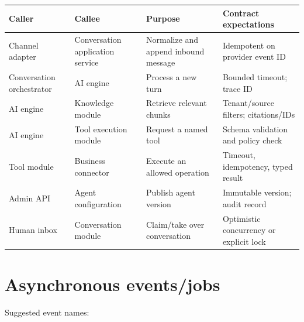 {\small
\begin{longtable}{@{}>{\raggedright\arraybackslash}p{}>{\raggedright\arraybackslash}p{}>{\raggedright\arraybackslash}p{}>{\raggedright\arraybackslash}p{}@{}}
\toprule
\textbf{Caller} & \textbf{Callee} & \textbf{Purpose} & \textbf{Contract expectations} \\
\midrule
\endhead
\bottomrule
\endfoot
Channel adapter & Conversation application service & Normalize and append inbound message & Idempotent on provider event ID \\
Conversation orchestrator & AI engine & Process a new turn & Bounded timeout; trace ID \\
AI engine & Knowledge module & Retrieve relevant chunks & Tenant/source filters; citations/IDs \\
AI engine & Tool execution module & Request a named tool & Schema validation and policy check \\
Tool module & Business connector & Execute an allowed operation & Timeout, idempotency, typed result \\
Admin API & Agent configuration & Publish agent version & Immutable version; audit record \\
Human inbox & Conversation module & Claim/take over conversation & Optimistic concurrency or explicit lock \\
\end{longtable}
}

\section{Asynchronous events/jobs}

Suggested event names:


